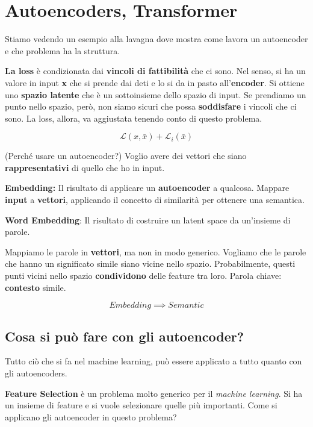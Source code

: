 \section{Autoencoders, Transformer}

Stiamo vedendo un esempio alla lavagna dove mostra come lavora un autoencoder e
che problema ha la struttura.

\textbf{La loss} è condizionata dai \textbf{vincoli di fattibilità} che ci sono. Nel senso,
si ha un valore in input \textbf{x} che si prende dai deti e lo si da in pasto all'\textbf{encoder}. Si ottiene uno
\textbf{spazio latente} che è un sottoinsieme dello spazio di input. Se prendiamo un punto nello spazio, però,
non siamo sicuri che possa \textbf{soddisfare} i vincoli che ci sono. La loss, allora, va aggiustata
tenendo conto di questo problema.

\[
    \mathcal{L}(x, \bar{x}) + \mathcal{L}_i(\bar{x})
\]

\begin{domanda}(Perché usare un autoencoder?)
    Voglio avere dei vettori che siano \textbf{rappresentativi} di quello che ho in input.
\end{domanda}

\textbf{Embedding:} Il risultato di applicare un \textbf{autoencoder} a qualcosa. Mappare \textbf{input} a \textbf{vettori}, applicando
il concetto di similarità per ottenere una semantica.

\textbf{Word Embedding}: Il risultato di costruire un latent space da un'insieme di parole.

Mappiamo le parole in \textbf{vettori}, ma non in modo generico. Vogliamo che
le parole che hanno un significato simile siano vicine nello spazio.
Probabilmente, questi punti vicini nello spazio \textbf{condividono} delle
feature tra loro. Parola chiave: \textbf{contesto} simile.

\[
    Embedding \implies Semantic
\]

\subsection{Cosa si può fare con gli autoencoder?}

Tutto ciò che si fa nel machine learning, può essere applicato a tutto quanto
con gli autoencoders.

\textbf{Feature Selection} è un problema molto generico per il \textit{machine learning}. Si ha un insieme di feature
e si vuole selezionare quelle più importanti. Come si applicano gli autoencoder in questo problema?

